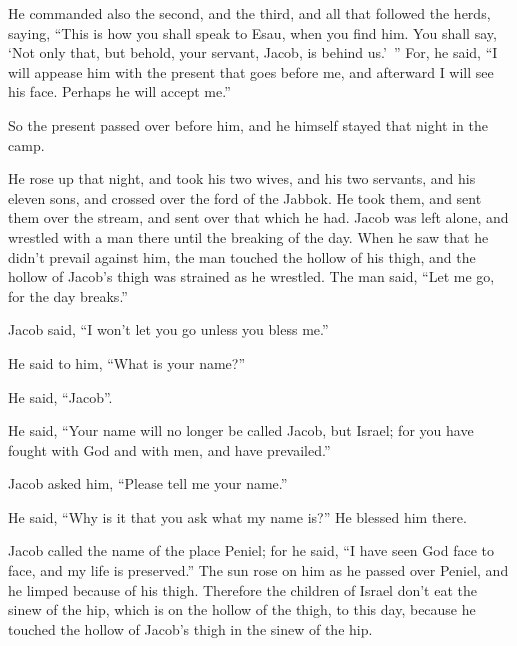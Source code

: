 {He commanded also the second, and the third, and all that followed the herds, saying, “This is how you shall speak to Esau, when you find him.
You shall say, ‘Not only that, but behold, your servant, Jacob, is behind us.’ ” For, he said, “I will appease him with the present that goes before me, and afterward I will see his face. Perhaps he will accept me.”
\par }{\PP {}So the present passed over before him, and he himself stayed that night in the camp.
\par }{\PP {}He rose up that night, and took his two wives, and his two servants, and his eleven sons, and crossed over the ford of the Jabbok.
He took them, and sent them over the stream, and sent over that which he had.
Jacob was left alone, and wrestled with a man there until the breaking of the day.
When he saw that he didn’t prevail against him, the man touched the hollow of his thigh, and the hollow of Jacob’s thigh was strained as he wrestled.
The man said, “Let me go, for the day breaks.”
\par }{\PP Jacob said, “I won’t let you go unless you bless me.”
\par }{\PP {}He said to him, “What is your name?”
\par }{\PP He said, “Jacob”.
\par }{\PP {}He said, “Your name will no longer be called Jacob, but Israel; for you have fought with God and with men, and have prevailed.”
\par }{\PP {}Jacob asked him, “Please tell me your name.”
\par }{\PP He said, “Why is it that you ask what my name is?” He blessed him there.
\par }{\PP {}Jacob called the name of the place Peniel; for he said, “I have seen God face to face, and my life is preserved.”
The sun rose on him as he passed over Peniel, and he limped because of his thigh.
Therefore the children of Israel don’t eat the sinew of the hip, which is on the hollow of the thigh, to this day, because he touched the hollow of Jacob’s thigh in the sinew of the hip.

}
